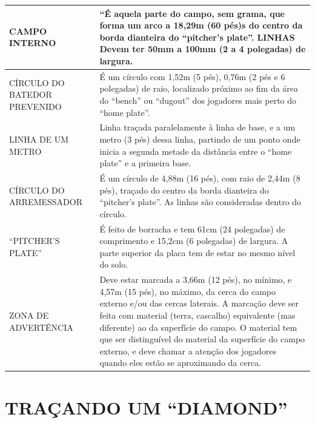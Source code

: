 {\begin{tabular}{p{40mm}p{160mm}}
		CAMPO INTERNO &
		“É aquela parte do campo, sem grama, que forma um arco a 18,29m (60 pés)s do
		centro da borda dianteira do “pitcher’s plate”. LINHAS
		Devem ter 50mm a 100mm (2 a 4 polegadas) de largura. \\\hline
		CÍRCULO DO BATEDOR PREVENIDO &
		É um círculo com 1,52m (5 pés), 0,76m (2 pés e 6 polegadas) de raio, localizado
		próximo ao fim da área do “bench” ou “dugout” dos jogadores mais perto do “home
		plate”. \\\hline
		LINHA DE UM METRO &
		Linha traçada paralelamente à linha de base, e a um metro (3 pés) dessa linha,
		partindo de um ponto onde inicia a segunda metade da distância entre o “home plate”
		e a primeira base. \\\hline
		CÍRCULO DO ARREMESSADOR &
		É um círculo de 4,88m (16 pés), com raio de 2,44m (8 pés), traçado do centro da borda
		dianteira do “pitcher’s plate”. As linhas são consideradas dentro do círculo. \\\hline
		“PITCHER’S PLATE” &
		É feito de borracha e tem 61cm (24 polegadas) de comprimento e 15,2cm (6
		polegadas) de largura. A parte superior da placa tem de estar no mesmo nível do solo. \\\hline
		ZONA DE ADVERTÊNCIA &
		Deve estar marcada a 3,66m (12 pés), no mínimo, e 4,57m (15 pés), no máximo, da
		cerca do campo externo e/ou das cercas laterais. A marcação deve ser feita com
		material (terra, cascalho) equivalente (mas diferente) ao da superfície do campo. O
		material tem que ser distinguível do material da superfície do campo externo, e deve
		chamar a atenção dos jogadores quando eles estão se aproximando da cerca. \\\hline

	\end{tabular}
}
\section{TRAÇANDO UM “DIAMOND” }

